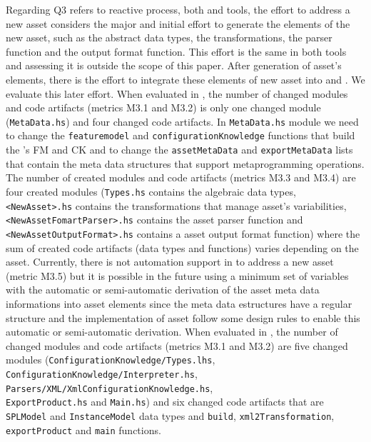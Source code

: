 Regarding Q3 refers to reactive process, both \hpl{} and \hp{} tools, the effort to address a new asset considers the major and initial effort to generate the elements of the new asset, such as the abstract data types, the transformations, the parser function and the output format function. This effort is the same in both tools and assessing it is outside the scope of this paper. After generation of asset's elements, there is the effort to integrate these elements of new asset into \hpl{} and \hp{}. We evaluate this later effort.
When evaluated in \hpl{}, the number of changed modules and code artifacts (metrics M3.1 and M3.2) is only one changed module (\texttt{MetaData.hs}) and four changed code artifacts. In \texttt{MetaData.hs} module we need to change the \texttt{featuremodel} and \texttt{configurationKnowledge} functions that build the \hpl's FM and CK and to change the \texttt{assetMetaData} and \texttt{exportMetaData} lists that contain the meta data structures that support metaprogramming operations. The number of created modules and code artifacts (metrics M3.3 and M3.4) are four created modules (\texttt{Types.hs} contains the algebraic data types, \texttt{<NewAsset>.hs} contains the transformations that manage asset's variabilities, \texttt{<NewAssetFomartParser>.hs} contains the asset parser function and \texttt{<NewAssetOutputFormat>.hs} contains a asset output format function) where the sum of created code artifacts (data types and functions) varies depending on the asset. 
Currently, there is not automation support in \hpl{} to address a new asset (metric M3.5) but it is possible in the future using a minimum set of variables with the automatic or semi-automatic derivation of the asset meta data informations into asset elements since the meta data estructures have a regular structure and the implementation of asset follow some design rules to enable this automatic or semi-automatic derivation. 
When evaluated in \hp{}, the number of changed modules and code artifacts (metrics M3.1 and M3.2) are five changed modules (\texttt{ConfigurationKnowledge/Types.lhs}, \\ \texttt{ConfigurationKnowledge/Interpreter.hs}, \\ \texttt{Parsers/XML/XmlConfigurationKnowledge.hs}, \\ \texttt{ExportProduct.hs} and \texttt{Main.hs}) and six changed code artifacts that are \texttt{SPLModel} and \texttt{InstanceModel} data types and \texttt{build}, \texttt{xml2Transformation}, \texttt{exportProduct} and \texttt{main} functions.
